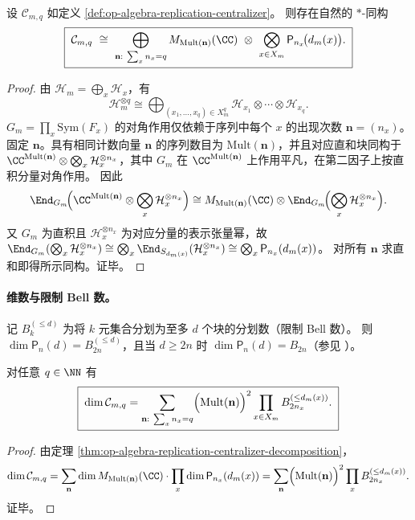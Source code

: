 \begin{theorem}[复制中心化代数的有色分块分解]\label{thm:op-algebra-replication-centralizer-decomposition}
设 \(\mathcal{C}_{m,q}\) 如定义 \ref{def:op-algebra-replication-centralizer}。
则存在自然的 \(\ast\)-同构
\[
\boxed{\;
\mathcal{C}_{m,q}\ \cong\ \bigoplus_{\mathbf n:\ \sum_x n_x=q}
M_{\mathrm{Mult}(\mathbf n)}(\CC)\ \otimes\ \bigotimes_{x\in X_m}\mathsf{P}_{n_x}\!\bigl(d_m(x)\bigr).\;}
\]
\end{theorem}
\begin{proof}
由 \(\mathcal{H}_m=\bigoplus_x\mathcal{H}_x\)，有
\[
\mathcal{H}_m^{\otimes q}\cong\bigoplus_{(x_1,\dots,x_q)\in X_m^q}\mathcal{H}_{x_1}\otimes\cdots\otimes \mathcal{H}_{x_q}.
\]
\(G_m=\prod_x \mathrm{Sym}(F_x)\) 的对角作用仅依赖于序列中每个 \(x\) 的出现次数 \(\mathbf n=(n_x)\)。
固定 \(\mathbf n\)。具有相同计数向量 \(\mathbf n\) 的序列数目为 \(\mathrm{Mult}(\mathbf n)\)，并且对应直和块同构于
\(
\CC^{\mathrm{Mult}(\mathbf n)}\otimes \bigotimes_x \mathcal{H}_x^{\otimes n_x}
\)，其中 \(G_m\) 在 \(\CC^{\Mult(\mathbf n)}\) 上作用平凡，在第二因子上按直积分量对角作用。
因此
\[
\End_{G_m}\!\Bigl(\CC^{\mathrm{Mult}(\mathbf n)}\otimes \bigotimes_x \mathcal{H}_x^{\otimes n_x}\Bigr)
\cong
M_{\mathrm{Mult}(\mathbf n)}(\CC)\otimes \End_{G_m}\!\Bigl(\bigotimes_x \mathcal{H}_x^{\otimes n_x}\Bigr).
\]
又 \(G_m\) 为直积且 \(\mathcal{H}_x^{\otimes n_x}\) 为对应分量的表示张量幂，故
\(
\End_{G_m}(\bigotimes_x \mathcal{H}_x^{\otimes n_x})
\cong
\bigotimes_x \End_{S_{d_m(x)}}(\mathcal{H}_x^{\otimes n_x})
\cong
\bigotimes_x \mathsf{P}_{n_x}(d_m(x))
\)。
对所有 \(\mathbf n\) 求直和即得所示同构。证毕。
\end{proof}

\paragraph{维数与限制 Bell 数。}
记 \(B_k^{(\le d)}\) 为将 \(k\) 元集合分划为至多 \(d\) 个块的分划数（限制 Bell 数）。
则 \(\dim \mathsf{P}_n(d)=B_{2n}^{(\le d)}\)，且当 \(d\ge 2n\) 时 \(\dim \mathsf{P}_n(d)=B_{2n}\)（参见 \cite{BenkartHalverson2017PartitionInvariants}）。

\begin{corollary}[中心化代数维数的闭式]\label{cor:op-algebra-replication-centralizer-dimension}
对任意 \(q\in\NN\) 有
\[
\boxed{\;
\dim \mathcal{C}_{m,q}
=\sum_{\mathbf n:\ \sum_x n_x=q}\Bigl(\mathrm{Mult}(\mathbf n)\Bigr)^2
\prod_{x\in X_m} B_{2n_x}^{(\le d_m(x))}. \;}
\]
\end{corollary}
\begin{proof}
由定理 \ref{thm:op-algebra-replication-centralizer-decomposition}，
\[
\dim\mathcal{C}_{m,q}
=\sum_{\mathbf n}\dim M_{\Mult(\mathbf n)}(\CC)\cdot\prod_x \dim\mathsf{P}_{n_x}(d_m(x))
=\sum_{\mathbf n}\Bigl(\Mult(\mathbf n)\Bigr)^2\prod_x B_{2n_x}^{(\le d_m(x))}.
\]
证毕。
\end{proof}

